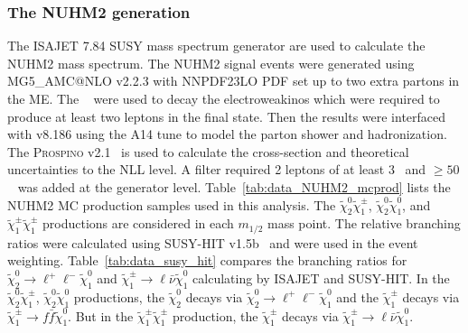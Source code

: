 \subsubsection{The NUHM2 generation}
\label{subsubsec:data_NUHM2_generation}
The \textsc{ISAJET} 7.84 SUSY mass spectrum generator are used to calculate the NUHM2 mass spectrum.
The NUHM2 signal events were generated using MG5\_{\scriptsize A}MC@NLO v2.2.3 with NNPDF23LO PDF set up to two extra partons in the ME.
The {\MADSPIN}~\cite{Artoisenet:2012st} were used to decay the electroweakinos which were required to produce at least two leptons in the final state.
Then the results were interfaced with {\PYTHIA} v8.186 using the A14 tune to model the parton shower and hadronization.
The \textsc{Prospino} v2.1~\cite{Beenakker:1996ed} is used to calculate the cross-section and theoretical uncertainties to the NLL level.
A filter required 2 leptons of at least 3~{\GeV} and \met $\ge 50$~{\GeV} was added at the generator level.
Table~\ref{tab:data_NUHM2_mcprod} lists the NUHM2 MC production samples used in this analysis.
The $\widetilde{\chi}^{0}_{2} \widetilde{\chi}^{\pm}_{1}$, $\widetilde{\chi}^{0}_{2} \widetilde{\chi}^{0}_{1}$, and $\widetilde{\chi}^{\pm}_{1} \widetilde{\chi}^{\pm}_{1}$ productions are considered in each $m_{1/2}$ mass point.
The relative branching ratios were calculated using SUSY-HIT v1.5b~\cite{Djouadi:2006bz} and were used in the event weighting.
Table~\ref{tab:data_susy_hit} compares the branching ratios for $\widetilde{\chi}^{0}_{2} \to \ell^{+} \ell^{-} \widetilde{\chi}^{0}_{1}$ and $\widetilde{\chi}^{\pm}_{1} \to \ell \bar{\nu} \widetilde{\chi}^{0}_{1}$ calculating by \textsc{ISAJET} and SUSY-HIT.
In the $\widetilde{\chi}^{0}_{2} \widetilde{\chi}^{\pm}_{1}$, $\widetilde{\chi}^{0}_{2} \widetilde{\chi}^{0}_{1}$ productions, the $\widetilde{\chi}^{0}_{2}$ decays via $\widetilde{\chi}^{0}_{2} \to \ell^{+} \ell^{-} \widetilde{\chi}^{0}_{1}$ and the $\widetilde{\chi}^{\pm}_{1}$ decays via $\widetilde{\chi}^{\pm}_{1} \to f\bar{f} \widetilde{\chi}^{0}_{1}$.
But in the $\widetilde{\chi}^{\pm}_{1} \widetilde{\chi}^{\pm}_{1}$ production, the $\widetilde{\chi}^{\pm}_{1}$ decays via $\widetilde{\chi}^{\pm}_{1} \to \ell \bar{\nu} \widetilde{\chi}^{0}_{1}$.

